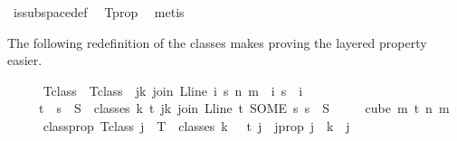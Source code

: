 \begin{isabellebody}
\ is{\isacharunderscore}{\kern0pt}subspace{\isacharunderscore}{\kern0pt}def\ \isamarkupfalse%
\ T{\isacharunderscore}{\kern0pt}prop\ \isamarkupfalse%
\ metis%
\endisatagproof
{\isafoldproof}%
%
\isadelimproof
%
\endisadelimproof
%
\isadelimdocument
%
\endisadelimdocument
%
\isatagdocument
%
\isamarkuptrue%
%
\begin{isamarkuptext}%
The following redefinition of the classes makes proving the layered property easier.%
\end{isamarkuptext}\isamarkuptrue%
%
\endisatagdocument
{\isafolddocument}%
%
\isadelimdocument
%
\endisadelimdocument
%
\isadelimproof
\ \ \ \ %
\endisadelimproof
%
\isatagproof
{}\isamarkupfalse%
\ T{\isacharunderscore}{\kern0pt}class\ \ {\isachardoublequoteopen}T{\isacharunderscore}{\kern0pt}class\ {\isasymequiv}\ {\isacharparenleft}{\kern0pt}{\isasymlambda}j{\isasymin}{\isacharbraceleft}{\kern0pt}{\isachardot}{\kern0pt}{\isachardot}{\kern0pt}k{\isacharbraceright}{\kern0pt}{\isachardot}{\kern0pt}\ {\isacharbraceleft}{\kern0pt}join\ {\isacharparenleft}{\kern0pt}L{\isacharunderscore}{\kern0pt}line\ i{\isacharparenright}{\kern0pt}\ s\ n\ m\ {\isacharbar}{\kern0pt}\ i\ s\ {\isachardot}{\kern0pt}\ i\isanewline
\ \ \ \ {\isasymin}\ {\isacharbraceleft}{\kern0pt}{\isachardot}{\kern0pt}{\isachardot}{\kern0pt}{\isacharless}{\kern0pt}t{\isacharbraceright}{\kern0pt}\ {\isasymand}\ s\ {\isasymin}\ S\ {\isacharbackquote}{\kern0pt}\ {\isacharparenleft}{\kern0pt}classes\ k\ t\ j{\isacharparenright}{\kern0pt}{\isacharbraceright}{\kern0pt}{\isacharparenright}{\kern0pt}{\isacharparenleft}{\kern0pt}k{\isacharplus}{\kern0pt}{}{\isacharcolon}{\kern0pt}{\isacharequal}{\kern0pt}\ {\isacharbraceleft}{\kern0pt}join\ {\isacharparenleft}{\kern0pt}L{\isacharunderscore}{\kern0pt}line\ t{\isacharparenright}{\kern0pt}\ {\isacharparenleft}{\kern0pt}SOME\ s{\isachardot}{\kern0pt}\ s\ {\isasymin}\ S\ {\isacharbackquote}{\kern0pt}\isanewline
\ \ \ \ {\isacharparenleft}{\kern0pt}cube\ m\ {\isacharparenleft}{\kern0pt}t{\isacharplus}{\kern0pt}{}{\isacharparenright}{\kern0pt}{\isacharparenright}{\kern0pt}{\isacharparenright}{\kern0pt}\ n\ m{\isacharbraceright}{\kern0pt}{\isacharparenright}{\kern0pt}{\isachardoublequoteclose}\isanewline
\ \ \ \ \isamarkupfalse%
\ classprop{\isacharcolon}{\kern0pt}\ {\isachardoublequoteopen}T{\isacharunderscore}{\kern0pt}class\ j\ {\isacharequal}{\kern0pt}\ T\ {\isacharbackquote}{\kern0pt}\ classes\ {\isacharparenleft}{\kern0pt}k\ {\isacharplus}{\kern0pt}\ {}{\isacharparenright}{\kern0pt}\ t\ j{\isachardoublequoteclose}\ \ j{\isacharunderscore}{\kern0pt}prop{\isacharcolon}{\kern0pt}\ {\isachardoublequoteopen}j\ {\isasymle}\ k{\isachardoublequoteclose}\ \ j\isanewline

\end{isabellebody}
